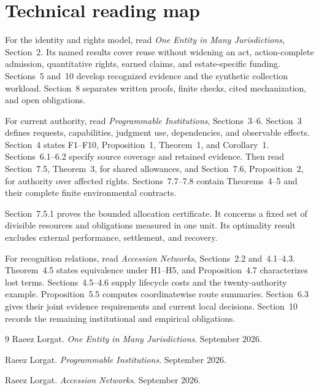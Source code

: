 \documentclass{momentum}
\begin{document}
\section{Technical reading map}
\label{sec:reading}

For the identity and rights model, read \emph{One Entity in Many Jurisdictions}, Section~2.
Its named results cover reuse without widening an act, action-complete admission, quantitative rights, earned claims, and estate-specific funding.
Sections~5 and~10 develop recognized evidence and the synthetic collection workload.
Section~8 separates written proofs, finite checks, cited mechanization, and open obligations.

For current authority, read \emph{Programmable Institutions}, Sections~3--6.
Section~3 defines requests, capabilities, judgment use, dependencies, and observable effects.
Section~4 states F1--F10, Proposition~1, Theorem~1, and Corollary~1.
Sections~6.1--6.2 specify source coverage and retained evidence.
Then read Section~7.5, Theorem~3, for shared allowances, and Section~7.6, Proposition~2, for authority over affected rights.
Sections~7.7--7.8 contain Theorems~4--5 and their complete finite environmental contracts.

Section~7.5.1 proves the bounded allocation certificate.
It concerns a fixed set of divisible resources and obligations measured in one unit.
Its optimality result excludes external performance, settlement, and recovery.

For recognition relations, read \emph{Accession Networks}, Sections~2.2 and~4.1--4.3.
Theorem~4.5 states equivalence under H1--H5, and Proposition~4.7 characterizes lost terms.
Sections~4.5--4.6 supply lifecycle costs and the twenty-authority example.
Proposition~5.5 computes coordinatewise route summaries.
Section~6.3 gives their joint evidence requirements and current local decisions.
Section~10 records the remaining institutional and empirical obligations.

\begin{thebibliography}{9}
Raeez Lorgat.
\emph{One Entity in Many Jurisdictions}.
September 2026.

Raeez Lorgat.
\emph{Programmable Institutions}.
September 2026.

Raeez Lorgat.
\emph{Accession Networks}.
September 2026.
\end{thebibliography}
\end{document}

